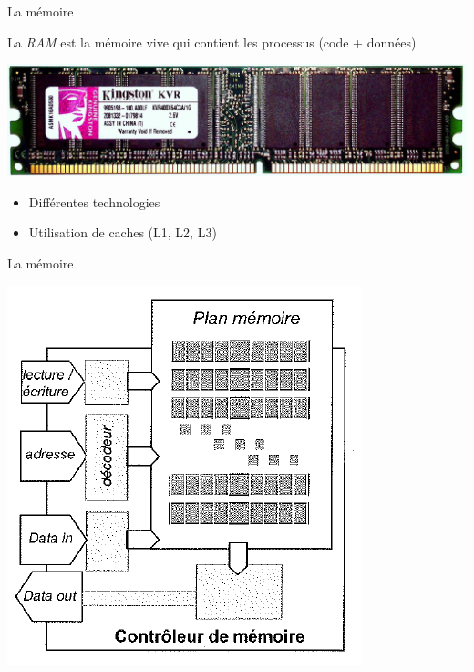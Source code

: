 \documentclass[14pt,xcolor,table]{beamer}
\begin{document}
\begin{frame}[fragile]{La mémoire}
	
	La \emph{RAM} est la mémoire vive qui contient les
	processus (code + données)

	\begin{center}
	\includegraphics[width=.7\textwidth]{images/ram-barette}
	\end{center}
	
	\begin{itemize}
	\item Différentes technologies
	\item Utilisation de caches (L1, L2, L3)
	\end{itemize}
	
\end{frame}

\begin{frame}[fragile]{La mémoire}
	
	\begin{center}
	\includegraphics[width=.6\textwidth]{images/RAM}
	\end{center}
	
\end{frame}



\end{document}
